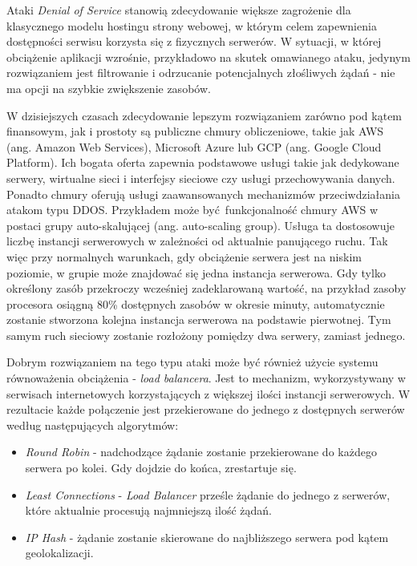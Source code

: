 \documentclass[12pt,twoside]{article}
\begin{document}
Ataki \emph{Denial of Service} stanowią zdecydowanie większe zagrożenie dla klasycznego modelu hostingu strony webowej, w którym celem zapewnienia dostępności serwisu korzysta się z fizycznych serwerów. W sytuacji, w której obciążenie aplikacji wzrośnie, przykładowo na skutek omawianego ataku, jedynym rozwiązaniem jest filtrowanie i odrzucanie potencjalnych złośliwych żądań - nie ma opcji na szybkie zwiększenie zasobów. 

W dzisiejszych czasach zdecydowanie lepszym rozwiązaniem zarówno pod kątem finansowym, jak i prostoty są publiczne chmury obliczeniowe, takie jak AWS (ang. Amazon Web Services), Microsoft Azure lub GCP (ang. Google Cloud Platform). Ich bogata oferta zapewnia podstawowe usługi takie jak dedykowane serwery, wirtualne sieci i interfejsy sieciowe czy usługi przechowywania danych. Ponadto chmury oferują usługi zaawansowanych mechanizmów przeciwdziałania atakom typu DDOS. Przykładem może być funkcjonalność chmury AWS w postaci grupy auto-skalującej (ang. auto-scaling group). Usługa ta dostosowuje liczbę instancji serwerowych w zależności od aktualnie panującego ruchu. Tak więc przy normalnych warunkach, gdy obciążenie serwera jest na niskim poziomie, w grupie może znajdować się jedna instancja serwerowa. Gdy tylko określony zasób przekroczy wcześniej zadeklarowaną wartość, na przykład zasoby procesora osiągną 80\% dostępnych zasobów w okresie minuty, automatycznie zostanie stworzona kolejna instancja serwerowa na podstawie pierwotnej. Tym samym ruch sieciowy zostanie rozłożony pomiędzy dwa serwery, zamiast jednego. 

Dobrym rozwiązaniem na tego typu ataki może być również użycie systemu równoważenia obciążenia - \emph{load balancera}. Jest to mechanizm, wykorzystywany w serwisach internetowych korzystających z większej ilości instancji serwerowych. W rezultacie każde połączenie jest przekierowane do jednego z dostępnych serwerów według następujących algorytmów:
\begin{itemize}
	\item \emph{Round Robin} - nadchodzące żądanie zostanie przekierowane do każdego serwera po kolei. Gdy dojdzie do końca, zrestartuje się.
	\item \emph{Least Connections} - \emph{Load Balancer} prześle żądanie do jednego z serwerów, które aktualnie procesują najmniejszą ilość żądań.
	\item \emph{IP Hash} - żądanie zostanie skierowane do najbliższego serwera pod kątem geolokalizacji. 
\end{itemize}
\end{document}
